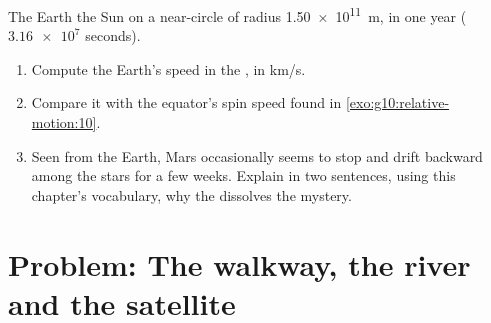 \begin{exercise}[$\star\star\star$]\label{exo:g10:relative-motion:15}
The Earth  the Sun on a near-circle of radius
\qty{1.50e11}{m}, in one year ($\num{3.16e7}$ seconds).
\begin{enumerate}
  \item Compute the Earth's speed in the , in
        \unit{km/s}.
  \item Compare it with the equator's spin speed found in
        \cref{exo:g10:relative-motion:10}.
  \item Seen from the Earth, Mars occasionally seems to stop and drift
        backward among the stars for a few weeks. Explain in two
        sentences, using this chapter's vocabulary, why the  dissolves the mystery.
\end{enumerate}
\end{exercise}

\section{Problem: The walkway, the river and the satellite}

